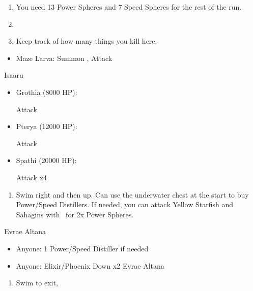 \begin{enumerate}[resume]
    \item You need 13 Power Spheres and 7 Speed Spheres for the rest of the run.
    \item \save
    \item Keep track of how many things you kill here.
\end{enumerate}
\begin{encounters}
    \begin{itemize}
        \item Maze Larva: Summon \ixion, Attack
    \end{itemize}
\end{encounters}
\bothvfill
\winvfill
\lossvfill
\begin{battle}{Isaaru}
    \begin{itemize}
        \item Grothia (8000 HP):
        \begin{itemize}
            \summon{\bahamut}
            \bahamutf Attack
        \end{itemize}
        \item Pterya (12000 HP):
        \begin{itemize}
            \summon{\bahamut}
            \bahamutf Attack
        \end{itemize}
        \item Spathi (20000 HP):
        \begin{itemize}
            \summon{\ixion}
            \ixionf Attack x4
        \end{itemize}
    \end{itemize}
\end{battle}
\begin{enumerate}[resume]
    \item Swim right and then up. Can use the underwater chest at the start to buy Power/Speed Distillers. If needed, you can attack Yellow Starfish and Sahagins with \tidus\ for 2x Power Spheres.
\end{enumerate}
\begin{battle}{Evrae Altana}
    \begin{itemize}
        \item Anyone: 1 Power/Speed Distiller if needed
        \item Anyone: Elixir/Phoenix Down x2 Evrae Altana
    \end{itemize}
\end{battle}
\begin{enumerate}[resume]
    \item Swim to exit, \sd
\end{enumerate}
\ 
\bothvfill
\ \bothnewline
\bothcb
\ 

\bothnpsingle